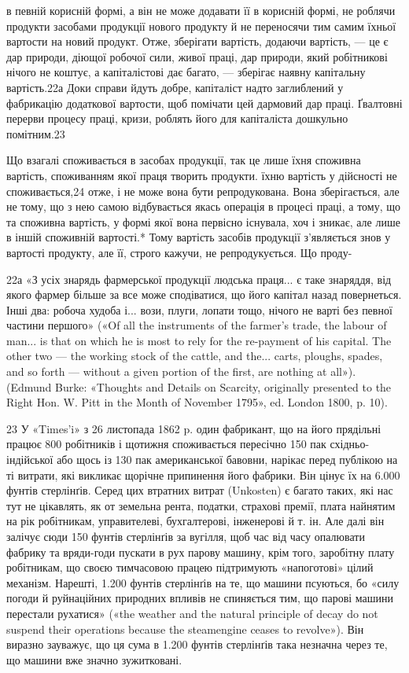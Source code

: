 в певній корисній формі, а він не може додавати її в корисній
формі, не роблячи продукти засобами продукції нового продукту
й не переносячи тим самим їхньої вартости на новий продукт.
Отже, зберігати вартість, додаючи вартість, — це є дар природи,
діющої робочої сили, живої праці, дар природи, який робітникові
нічого не коштує, а капіталістові дає багато, — зберігає наявну
капітальну вартість.22а  Доки справи йдуть добре, капіталіст
надто заглиблений у фабрикацію додаткової вартости, щоб помічати
цей дармовий дар праці. Ґвалтовні перерви процесу праці,
кризи, роблять його для капіталіста дошкульно помітним.23

Що взагалі споживається в засобах продукції, так це лише
їхня споживна вартість, споживанням якої праця творить продукти.
їхню вартість у дійсності не споживається,24 отже, і
не може вона бути репродукована. Вона зберігається, але не
тому, що з нею самою відбувається якась операція в процесі
праці, а тому, що та споживна вартість, у формі якої вона первісно
існувала, хоч і зникає, але лише в іншій споживній вартості.*
Тому вартість засобів продукції з’являється знов у вартості
продукту, але її, строго кажучи, не репродукується. Що проду-

22а «З усіх знарядь фармерської продукції людська праця... є таке
знаряддя, від якого фармер більше за все може сподіватися, що його капітал
назад повернеться. Інші два: робоча худоба і... вози, плуги, лопати
тощо, нічого не варті без певної частини першого» («Of all the instruments
of the farmer’s trade, the labour of man... is that on which he is most to
rely for the re-payment of his capital. The other two — the working stock
of the cattle, and the... carts, ploughs, spades, and so forth — without a given
portion of the first, are nothing at all»). (Edmund Burke: «Thoughts and
Details on Scarcity, originally presented to the Right Hon. W. Pitt in the
Month of November 1795», ed. London 1800, p. 10).

23    У «Times’i» з 26 листопада 1862 p. один фабрикант, що на його
прядільні працює 800 робітників і щотижня споживається пересічно 150 пак
східньо-індійської або щось із 130 пак американської бавовни, нарікає
перед публікою на ті витрати, які викликає щорічне припинення його
фабрики. Він цінує їх на 6.000 фунтів стерлінґів. Серед цих втратних
витрат (Unkosten) є багато таких, які нас тут не цікавлять, як от земельна
рента, податки, страхові премії, плата найнятим на рік робітникам, управителеві,
бухгалтерові, інженерові й т. ін. Але далі він залічує сюди
150 фунтів стерлінґів за вугілля, щоб час від часу опалювати фабрику та
вряди-годи пускати в рух парову машину, крім того, заробітну плату
робітникам, що своєю тимчасовою працею підтримують «напоготові»
цілий механізм. Нарешті, 1.200 фунтів стерлінґів на те, що машини псуються,
бо «силу погоди й руйнаційних природних впливів не спиняється
тим, що парові машини перестали рухатися» («the weather and the natural
principle of decay do not suspend their operations because the steamengine
ceases to revolve»). Він виразно зауважує, що ця сума в 1.200 фунтів
стерлінґів така незначна через те, що машини вже значно зужитковані.

